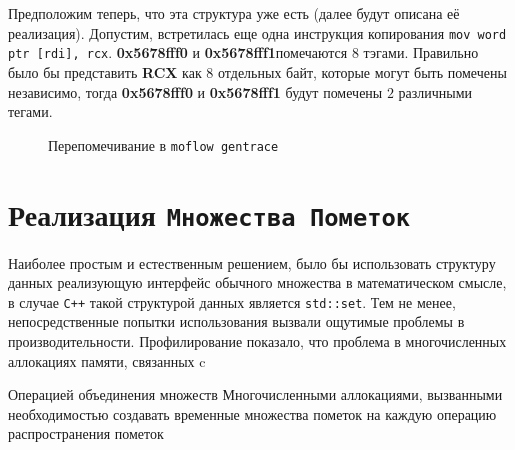 Предположим теперь, что эта структура уже есть (далее будут описана её реализация). Допустим, встретилась еще одна инструкция копирования \texttt{mov word ptr [rdi], rcx}. \textbf{0x5678fff0} и \textbf{0x5678fff1}помечаются $8$ тэгами. Правильно было бы представить \textbf{RCX} как 8 отдельных байт, которые могут быть помечены независимо, тогда \textbf{0x5678fff0} и \textbf{0x5678fff1} будут помечены $2$ различными тегами.

\begin{figure}[H]
    \caption{Перепомечивание в \texttt{moflow gentrace}}
    \label{fig:moflow3}
\end{figure}

\section{Реализация \texttt{Множества Пометок}}

Наиболее простым и естественным решением, было бы использовать структуру данных реализующую интерфейс обычного множества в математическом смысле, в случае \texttt{C++} такой структурой данных является \texttt{std::set}. Тем не менее, непосредственные попытки использования вызвали ощутимые проблемы в производительности. Профилирование показало, что проблема в многочисленных аллокациях памяти, связанных c

\begin{itemize}
    \text Операцией объединения множеств
    \text Многочисленными аллокациями, вызванными необходимостью создавать временные множества пометок на каждую операцию распространения пометок
\end{itemize}


